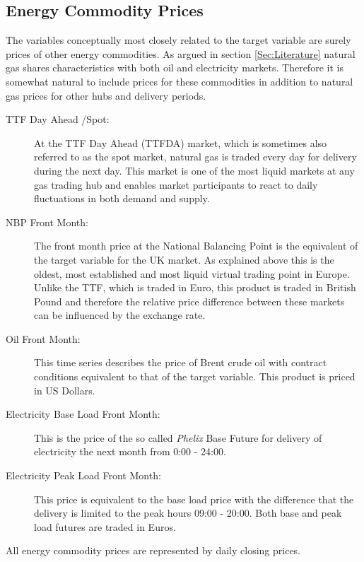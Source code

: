 \subsection{Energy Commodity Prices}
The variables conceptually most closely related to the target variable are surely prices of other energy commodities. As argued in  section \ref{Sec:Literature} natural gas shares characteristics with both oil and electricity markets. Therefore it is somewhat natural to include prices for these commodities in addition to natural gas prices for other hubs and delivery periods.
\begin{description}
\item[TTF Day Ahead /Spot:] At the TTF Day Ahead (TTFDA) market, which is sometimes also referred to as the spot market, natural gas is traded every day for delivery during the next day. This market is one of the most liquid markets at any gas trading hub and enables market participants to react to daily fluctuations in both demand and supply.
\item[NBP Front Month:] The front month price at the National Balancing Point is the equivalent of the target variable for the UK market. As explained above this is the oldest, most established and most liquid virtual trading point in Europe. Unlike the TTF, which is traded in Euro, this product is traded in British Pound and therefore the relative price difference between these markets can be influenced by the exchange rate.
\item[Oil Front Month:] This time series describes the price of  Brent crude oil with contract conditions equivalent to that of the target variable. This product is priced in US Dollars.
\item[Electricity Base Load Front Month:] This is the price of the so called \textit{Phelix} Base Future for delivery of electricity the next month from 0:00 - 24:00.
\item[Electricity Peak Load Front Month:] This price is equivalent to the base load price with the difference that the delivery is limited to the peak hours 09:00 - 20:00. Both base and peak load futures are traded in Euros.
\end{description}
All energy commodity prices are represented by daily closing prices.
